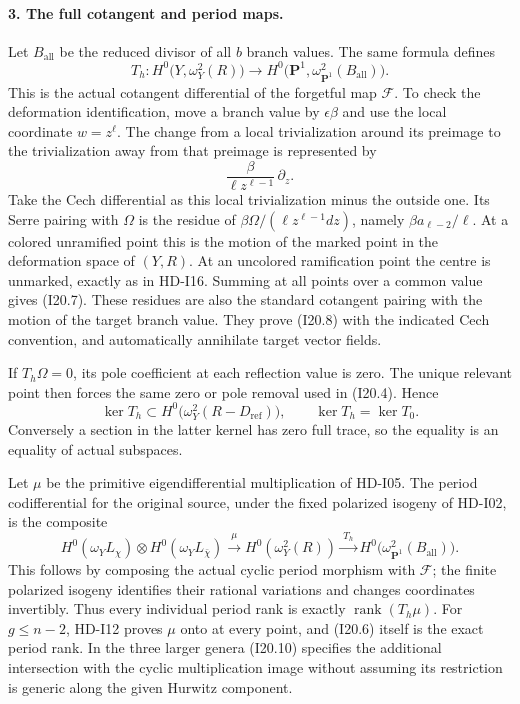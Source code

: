 \paragraph{3. The full cotangent and period maps.}
Let $B_{\mathrm{all}}$ be the reduced divisor of all $b$ branch
values. The same formula defines
\begin{equation}
 T_h:H^0\bigl(Y,\omega_Y^2(R)\bigr)
       \longrightarrow
       H^0\bigl(\mathbf P^1,
                         \omega_{\mathbf P^1}^2(B_{\mathrm{all}})\bigr).
                                                        \tag{I20.8}
\end{equation}
This is the actual cotangent differential of the forgetful
map $\mathcal F$. To check the deformation identification,
move a branch value by $\epsilon\beta$ and use the local
coordinate $w=z^\ell$. The change from a local trivialization
around its preimage to the trivialization away from that
preimage is represented by
\[
            \frac{\beta}{\ell z^{\ell-1}}\,\partial_z.
\]
Take the Cech differential as this local trivialization minus
the outside one. Its Serre pairing with $\Omega$ is the
residue of $\beta\Omega/(\ell z^{\ell-1}dz)$, namely
$\beta a_{\ell-2}/\ell$. At a colored unramified point this
is the motion of the marked point in the deformation space
of $(Y,R)$. At an uncolored ramification point the centre is
unmarked, exactly as in HD-I16. Summing at all points over a
common value gives (I20.7). These residues are also the
standard cotangent pairing with the motion of the target
branch value. They prove (I20.8) with the indicated Cech
convention, and automatically annihilate target vector fields.

If $T_h\Omega=0$, its pole coefficient at each reflection
value is zero. The unique relevant point then forces the
same zero or pole removal used in (I20.4). Hence
\[
 \ker T_h\subset
        H^0\bigl(\omega_Y^2(R-D_{\mathrm{ref}})\bigr),
 \qquad \ker T_h=\ker T_0.                            \tag{I20.9}
\]
Conversely a section in the latter kernel has zero full trace,
so the equality is an equality of actual subspaces.

Let $\mu$ be the primitive eigendifferential multiplication
of HD-I05. The period codifferential for the original source,
under the fixed polarized isogeny of HD-I02, is the composite
\begin{equation}
 H^0(\omega_YL_\chi)\otimes H^0(\omega_YL_{\bar\chi})
       \xrightarrow{\ \mu\ }H^0(\omega_Y^2(R))
       \xrightarrow{\ T_h\ }
       H^0\bigl(\omega_{\mathbf P^1}^2(B_{\mathrm{all}})\bigr).
                                                        \tag{I20.10}
\end{equation}
This follows by composing the actual cyclic period morphism
with $\mathcal F$; the finite polarized isogeny identifies
their rational variations and changes coordinates invertibly.
Thus every individual period rank is exactly
$\operatorname{rank}(T_h\mu)$. For $g\leq n-2$, HD-I12
proves $\mu$ onto at every point, and (I20.6) itself is the
exact period rank. In the three larger genera (I20.10)
specifies the additional intersection with the cyclic
multiplication image without assuming its restriction is
generic along the given Hurwitz component.

